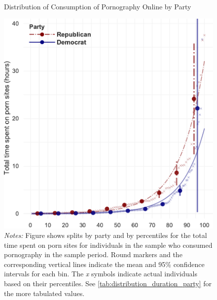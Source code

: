 \documentclass[12pt, letterpaper]{article}
\begin{document}
\begin{figure}[ht]
	\centering
	\caption{Distribution of Consumption of Pornography Online by Party}
	\includegraphics[width=.6\linewidth]{../figs/distribution_duration_on_adultsites_by_party.pdf}
	\caption*{\footnotesize \emph{Notes:} 
		Figure shows splits by party and by percentiles for the total time spent on porn sites for individuals in the sample who consumed pornography in the sample period.
		Round markers and the corresponding vertical lines indicate the mean and 95\% confidence intervals for each bin.
		The \emph{x} symbols indicate actual individuals based on their percentiles.
		See \cref{tab:distribution_duration_party} for the more tabulated values.
	}
	\label{fig:distribution_duration_party}
\end{figure}
\end{document}
